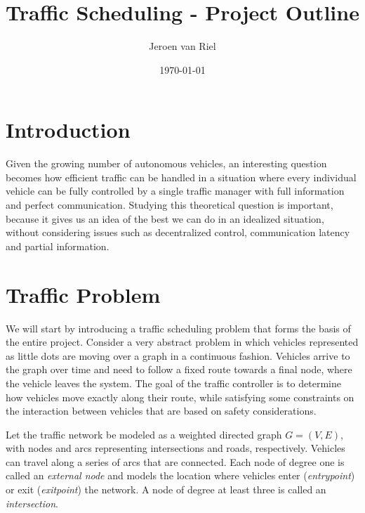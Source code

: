 \documentclass{article}
\title{Traffic Scheduling - Project Outline}
\author{Jeroen van Riel}
\date{\monthyeardate\today}
\theoremstyle{definition}
\theoremstyle{plain}
\begin{document}
\maketitle





\section{Introduction}

Given the growing number of autonomous vehicles, an interesting question becomes
how efficient traffic can be handled in a situation where every individual
vehicle can be fully controlled by a single traffic manager with full
information and perfect communication. Studying this theoretical question is
important, because it gives us an idea of the best we can do in an idealized
situation, without considering issues such as decentralized control,
communication latency and partial information.


\section{Traffic Problem}

We will start by introducing a traffic scheduling problem that forms the basis
of the entire project. Consider a very abstract problem in which vehicles
represented as little dots are moving over a graph in a continuous fashion.
Vehicles arrive to the graph over time and need to follow a fixed route towards
a final node, where the vehicle leaves the system. The goal of the traffic
controller is to determine how vehicles move exactly along their route, while
satisfying some constraints on the interaction between vehicles that are based
on safety considerations.

Let the traffic network be modeled as a weighted directed graph $G=(V,E)$, with
nodes and arcs representing intersections and roads, respectively. Vehicles can
travel along a series of arcs that are connected. Each node of degree one is
called an \textit{external node} and models the location where vehicles enter
(\textit{entrypoint}) or exit (\textit{exitpoint}) the network. A node of degree
at least three is called an \textit{intersection}.
\end{document}
